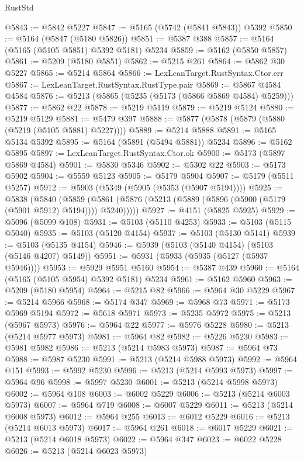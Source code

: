 \begin{lexlean}{RustStd}
\begin{coremodule}
@5843 := @5842 @5227
@5847 := @5165 (@5742 (@5841 @5843)) @5392
@5850 := @5164 (@5847 (@5180 @5826))
@5851 := @5387 @388
@5857 := @5164 (@5165 (@5105 @5851) @5392 @5181) @5234
@5859 := @5162 (@5850 @5857)
@5861 := @5209 (@5180 @5851)
@5862 := @5215 @261
@5864 := @5862 @30 @5227
@5865 := @5214 @5864
@5866 := LexLeanTarget.RustSyntax.Ctor.err
@5867 := LexLeanTarget.RustSyntax.RustType.pair
@5869 := @5867 @4584 @4584
@5876 := @5213 (@5865 (@5235 (@5173 (@5866 @5869 @4584) @5259)))
@5877 := @5862 @22
@5878 := @5219 @5119
@5879 := @5219 @5124
@5880 := @5219 @5129
@5881 := @5479 @397
@5888 := @5877 (@5878 (@5879 (@5880 (@5219 (@5105 @5881) @5227))))
@5889 := @5214 @5888
@5891 := @5165 @5134 @5392
@5895 := @5164 (@5891 (@5494 @5881)) @5234
@5896 := @5162 @5895
@5897 := LexLeanTarget.RustSyntax.Ctor.ok
@5900 := @5173 (@5897 @5869 @4584)
@5901 := @5830 @5346
@5902 := @5302 @22
@5903 := @5173 @5902
@5904 := @5559 @5123
@5905 := @5179 @5904
@5907 := @5179 (@5511 @5257)
@5912 := @5903 (@5349 (@5905 (@5353 (@5907 @5194))))
@5925 := @5838
    (@5840
      (@5859 (@5861 (@5876 (@5213 (@5889 (@5896 (@5900 (@5179 (@5901 @5912) @5194)))) @5240)))))
@5927 := @4151 (@5825 @5925)
@5929 := @5096 (@5099 @108)
@5931 := @5103 (@5110 @4253)
@5933 := @5103 (@5115 @5040)
@5935 := @5103 (@5120 @4154)
@5937 := @5103 (@5130 @5141)
@5939 := @5103 (@5135 @4154)
@5946 := @5939 (@5103 (@5140 @4154) (@5103 (@5146 @4207) @5149))
@5951 := @5931 (@5933 (@5935 (@5127 (@5937 @5946))))
@5953 := @5929 @5951 @5160
@5954 := @5387 @439
@5960 := @5164 (@5165 (@5105 @5954) @5392 @5181) @5234
@5961 := @5162 @5960
@5963 := @5209 (@5180 @5954)
@5964 := @5215 @82
@5966 := @5964 @30 @5229
@5967 := @5214 @5966
@5968 := @5174 @347
@5969 := @5968 @73
@5971 := @5173 @5969 @5194
@5972 := @5618 @5971
@5973 := @5235 @5972
@5975 := @5213 (@5967 @5973)
@5976 := @5964 @22
@5977 := @5976 @5228
@5980 := @5213 (@5214 @5977 @5973)
@5981 := @5964 @82
@5982 := @5226 @5230
@5983 := @5981 @5982
@5986 := @5213 (@5214 @5983 @5973)
@5987 := @5964 @73
@5988 := @5987 @5230
@5991 := @5213 (@5214 @5988 @5973)
@5992 := @5964 @151
@5993 := @5992 @5230
@5996 := @5213 (@5214 @5993 @5973)
@5997 := @5964 @96
@5998 := @5997 @5230
@6001 := @5213 (@5214 @5998 @5973)
@6002 := @5964 @108
@6003 := @6002 @5229
@6006 := @5213 (@5214 @6003 @5973)
@6007 := @5964 @719
@6008 := @6007 @5229
@6011 := @5213 (@5214 @6008 @5973)
@6012 := @5964 @255
@6013 := @6012 @5229
@6016 := @5213 (@5214 @6013 @5973)
@6017 := @5964 @261
@6018 := @6017 @5229
@6021 := @5213 (@5214 @6018 @5973)
@6022 := @5964 @347
@6023 := @6022 @5228
@6026 := @5213 (@5214 @6023 @5973)

\end{coremodule}
\end{lexlean}
